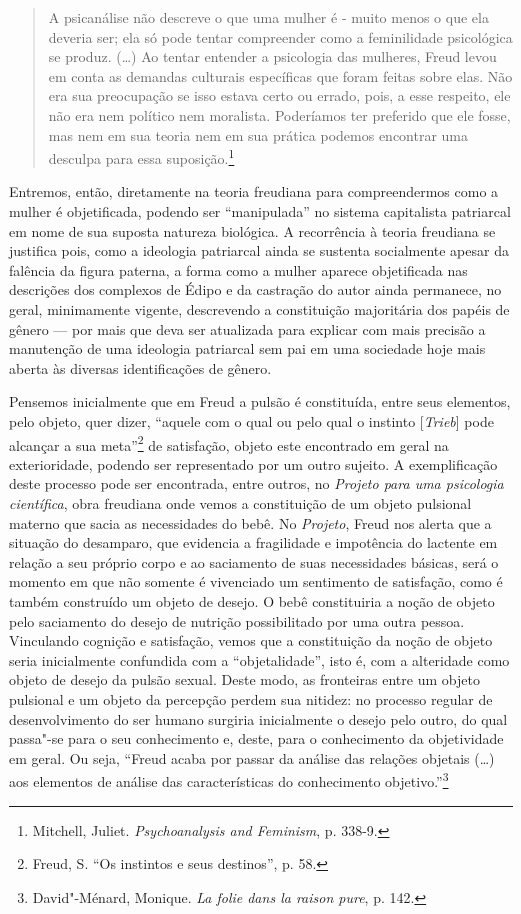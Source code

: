 \begin{quote}
A psicanálise não descreve o que uma mulher é - muito menos o que ela
deveria ser; ela só pode tentar compreender como a feminilidade
psicológica se produz. (\ldots{}) Ao tentar entender a psicologia das
mulheres, Freud levou em conta as demandas culturais específicas que
foram feitas sobre elas. Não era sua preocupação se isso estava certo ou
errado, pois, a esse respeito, ele não era nem político nem moralista.
Poderíamos ter preferido que ele fosse, mas nem em sua teoria nem em sua
prática podemos encontrar uma desculpa para essa suposição.\footnote{Mitchell,
  Juliet. \emph{Psychoanalysis and Feminism}, p. 338-9.}
\end{quote}

Entremos, então, diretamente na teoria freudiana para compreendermos
como a mulher é objetificada, podendo ser ``manipulada'' no sistema
capitalista patriarcal em nome de sua suposta natureza biológica. A
recorrência à teoria freudiana se justifica pois, como a ideologia
patriarcal ainda se sustenta socialmente apesar da falência da figura
paterna, a forma como a mulher aparece objetificada nas descrições dos
complexos de Édipo e da castração do autor ainda permanece, no geral,
minimamente vigente, descrevendo a constituição majoritária dos papéis
de gênero --- por mais que deva ser atualizada para explicar com mais
precisão a manutenção de uma ideologia patriarcal sem pai em uma
sociedade hoje mais aberta às diversas identificações de gênero.

Pensemos inicialmente que em Freud a pulsão é constituída, entre seus
elementos, pelo objeto, quer dizer, ``aquele com o qual ou pelo qual o
instinto {[}\emph{Trieb}{]} pode alcançar a sua meta''\footnote{Freud,
  S. ``Os instintos e seus destinos'', p. 58.} de
satisfação, objeto este encontrado em geral na exterioridade, podendo
ser representado por um outro sujeito. A exemplificação deste processo
pode ser encontrada, entre outros, no \emph{Projeto para uma psicologia
científica}, obra freudiana onde vemos a constituição de um objeto
pulsional materno que sacia as necessidades do bebê. No \emph{Projeto},
Freud nos alerta que a situação do desamparo, que evidencia a
fragilidade e impotência do lactente em relação a seu próprio corpo e ao
saciamento de suas necessidades básicas, será o momento em que não
somente é vivenciado um sentimento de satisfação, como é também
construído um objeto de desejo. O bebê constituiria a noção de objeto
pelo saciamento do desejo de nutrição possibilitado por uma outra
pessoa. Vinculando cognição e satisfação, vemos que a constituição da
noção de objeto seria inicialmente confundida com a ``objetalidade'',
isto é, com a alteridade como objeto de desejo da pulsão sexual. Deste
modo, as fronteiras entre um objeto pulsional e um objeto da percepção
perdem sua nitidez: no processo regular de desenvolvimento do ser humano
surgiria inicialmente o desejo pelo outro, do qual passa"-se para o seu
conhecimento e, deste, para o conhecimento da objetividade em geral. Ou
seja, ``Freud acaba por passar da análise das relações objetais (\ldots{})
aos elementos de análise das características do conhecimento
objetivo.''\footnote{David"-Ménard, Monique. \emph{La
  folie dans la raison pure}, p. 142.}


